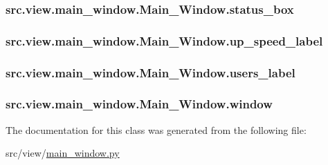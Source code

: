 \subsubsection[{status\+\_\+box}]{\setlength{\rightskip}{0pt plus 5cm}src.\+view.\+main\+\_\+window.\+Main\+\_\+\+Window.\+status\+\_\+box}\label{classsrc_1_1view_1_1main__window_1_1Main__Window_aefce252afd2226a6ae5800b5048b138e}
\hypertarget{classsrc_1_1view_1_1main__window_1_1Main__Window_a979c127a0d3d8e268e34d1f42d08f9e4}{}
\subsubsection[{up\+\_\+speed\+\_\+label}]{\setlength{\rightskip}{0pt plus 5cm}src.\+view.\+main\+\_\+window.\+Main\+\_\+\+Window.\+up\+\_\+speed\+\_\+label}\label{classsrc_1_1view_1_1main__window_1_1Main__Window_a979c127a0d3d8e268e34d1f42d08f9e4}
\hypertarget{classsrc_1_1view_1_1main__window_1_1Main__Window_a6cdc98b9d18f4ebad3dc497900a9be70}{}
\subsubsection[{users\+\_\+label}]{\setlength{\rightskip}{0pt plus 5cm}src.\+view.\+main\+\_\+window.\+Main\+\_\+\+Window.\+users\+\_\+label}\label{classsrc_1_1view_1_1main__window_1_1Main__Window_a6cdc98b9d18f4ebad3dc497900a9be70}
\hypertarget{classsrc_1_1view_1_1main__window_1_1Main__Window_a8644cd8403ec3e07c40c175ac02d12f8}{}
\subsubsection[{window}]{\setlength{\rightskip}{0pt plus 5cm}src.\+view.\+main\+\_\+window.\+Main\+\_\+\+Window.\+window}\label{classsrc_1_1view_1_1main__window_1_1Main__Window_a8644cd8403ec3e07c40c175ac02d12f8}


The documentation for this class was generated from the following file\+:\begin{DoxyCompactItemize}
\item 
src/view/\hyperlink{main__window_8py}{main\+\_\+window.\+py}\end{DoxyCompactItemize}

